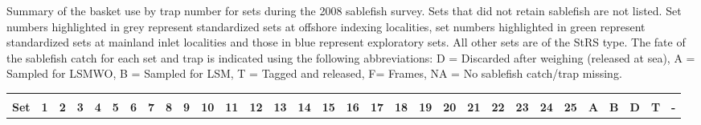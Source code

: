 \documentclass[12pt]{article}\usepackage[]{graphicx}\usepackage[]{color}
\begin{document}
\begin{appendices}
Summary of the basket use by trap number for sets during the 2008 sablefish survey. Sets that did not retain sablefish are not listed. Set numbers highlighted in grey represent standardized sets at offshore indexing localities, set numbers highlighted in green represent standardized sets at mainland inlet localities and those in blue represent exploratory sets. All other sets are of the StRS type. The fate of the sablefish catch for each set and trap is indicated using the following abbreviations: D = Discarded after weighing (released at sea), A = Sampled for LSMWO, B = Sampled for LSM, T = Tagged and released, F= Frames, NA = No sablefish catch/trap missing.
\begin{landscape}\begingroup\fontsize{6}{8}\selectfont
\begin{longtable}{>{\raggedright\arraybackslash}p{0.8cm}>{\raggedright\arraybackslash}p{0.2cm}>{\raggedright\arraybackslash}p{0.2cm}>{\raggedright\arraybackslash}p{0.2cm}>{\raggedright\arraybackslash}p{0.2cm}>{\raggedright\arraybackslash}p{0.2cm}>{\raggedright\arraybackslash}p{0.2cm}>{\raggedright\arraybackslash}p{0.2cm}>{\raggedright\arraybackslash}p{0.2cm}>{\raggedright\arraybackslash}p{0.2cm}>{\raggedright\arraybackslash}p{0.2cm}>{\raggedright\arraybackslash}p{0.2cm}>{\raggedright\arraybackslash}p{0.2cm}>{\raggedright\arraybackslash}p{0.2cm}>{\raggedright\arraybackslash}p{0.2cm}>{\raggedright\arraybackslash}p{0.2cm}>{\raggedright\arraybackslash}p{0.2cm}>{\raggedright\arraybackslash}p{0.2cm}>{\raggedright\arraybackslash}p{0.2cm}>{\raggedright\arraybackslash}p{0.2cm}>{\raggedright\arraybackslash}p{0.2cm}>{\raggedright\arraybackslash}p{0.2cm}>{\raggedright\arraybackslash}p{0.2cm}>{\raggedright\arraybackslash}p{0.2cm}>{\raggedright\arraybackslash}p{0.2cm}>{\raggedright\arraybackslash}p{0.2cm}>{\raggedleft\arraybackslash}p{0.2cm}>{\raggedleft\arraybackslash}p{0.2cm}>{\raggedleft\arraybackslash}p{0.2cm}>{\raggedleft\arraybackslash}p{0.2cm}>{\raggedleft\arraybackslash}p{0.2cm}}
\toprule
\multicolumn{1}{c}{\textbf{ }} & \multicolumn{25}{c}{\textbf{Trap}} & \multicolumn{5}{c}{\textbf{Total}} \\
\cmidrule(l{3pt}r{3pt}){2-26} \cmidrule(l{3pt}r{3pt}){27-31}
\textbf{Set} & \textbf{1} & \textbf{2} & \textbf{3} & \textbf{4} & \textbf{5} & \textbf{6} & \textbf{7} & \textbf{8} & \textbf{9} & \textbf{10} & \textbf{11} & \textbf{12} & \textbf{13} & \textbf{14} & \textbf{15} & \textbf{16} & \textbf{17} & \textbf{18} & \textbf{19} & \textbf{20} & \textbf{21} & \textbf{22} & \textbf{23} & \textbf{24} & \textbf{25} & \textbf{A} & \textbf{B} & \textbf{D} & \textbf{T} & \textbf{-}\\

\end{longtable}
\end{landscape}
\end{appendices}
\end{document}
